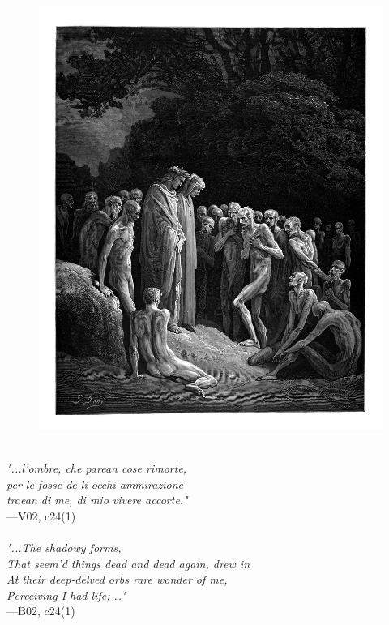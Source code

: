 \documentclass[../Dore_vision.tex]{subfiles}
\begin{document}
\begin{figure}[ht]
\centering
\includegraphics[height=\figsize]{illustrations/book_2/V02, c24(1).jpg}
\end{figure}

\begin{center}
\begin{minipage}{0.8\linewidth}
\textit{\\
"...l’ombre, che parean cose rimorte,\\per le fosse de li occhi ammirazione\\traean di me, di mio vivere accorte."} \\
—V02, c24(1) \\~\\
\textit{"...The shadowy forms,\\That seem'd things dead and dead again, drew in\\At their deep-delved orbs rare wonder of me,\\Perceiving I had life; …"} \\
—B02, c24(1)
\end{minipage}
\end{center}
\end{document}
